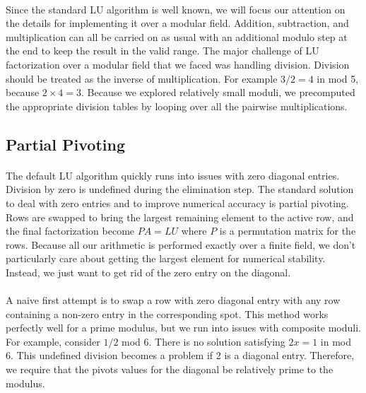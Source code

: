 \documentclass[11pt]{article}
\begin{document}
\paragraph{} Since the standard LU algorithm is well known, we will focus our attention on the details for implementing it over a modular field.  Addition, subtraction, and multiplication can all be carried on as usual with an additional modulo step at the end to keep the result in the valid range.  The major challenge of LU factorization over a modular field that we faced was handling division.  Division should be treated as the inverse of multiplication.  For example $3 / 2 = 4$ in mod 5, because $2 \times 4 = 3$.  Because we explored relatively small moduli, we precomputed the appropriate division tables by looping over all the pairwise multiplications.


\subsection*{Partial Pivoting}

\paragraph{} The default LU algorithm quickly runs into issues with zero diagonal entries.  Division by zero is undefined during the elimination step.  The standard solution to deal with zero entries and to improve numerical accuracy is partial pivoting.  Rows are swapped to bring the largest remaining element to the active row, and the final factorization become $PA = LU$ where $P$ is a permutation matrix for the rows.  Because all our arithmetic is performed exactly over a finite field, we don’t particularly care about getting the largest element for numerical stability.  Instead, we just want to get rid of the zero entry on the diagonal.


\paragraph{} A naive first attempt is to swap a row with zero diagonal entry with any row containing a non-zero entry in the corresponding spot.  This method works perfectly well for a prime modulus, but we run into issues with composite moduli.  For example, consider $1 / 2$ mod 6.  There is no solution satisfying $2x = 1$ in mod 6.  This undefined division becomes a problem if 2 is a diagonal entry.  Therefore, we require that the pivots values for the diagonal be relatively prime to the modulus.
\end{document}
